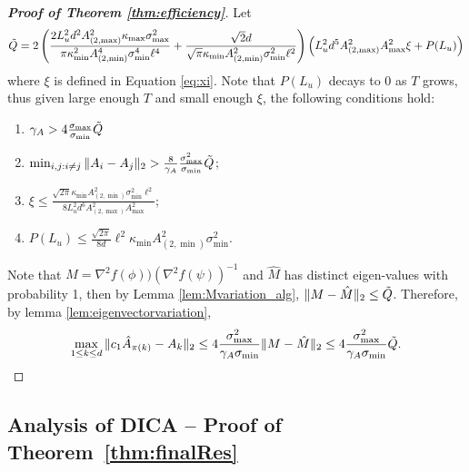 \begin{proof}[{\bf Proof of Theorem  \ref{thm:efficiency}}]
Let 
 \begin{align*}
\tilde{Q} = 2\left( \frac{2L_u^2d^2A_{(2,\max)}^2\kappa_{\max}\sigma_{\max}^2}{\pi\kappa^2_{\min}A^4_{(2,\min)}\sigma_{\min}^4\ell^4} + 
\frac{\sqrt{2}d}{\sqrt{\pi}\kappa_{\min}A^2_{(2,\min)}\sigma_{\min}^2\ell^2}
\right)\left(L_u^2d^5 A_{(2,\max)}^2A_{\max}^2\xi + P(L_u)\right)
 \end{align*}
 where $\xi$ is defined in Equation \eqref{eq:xi}.
 Note that $P(L_u)$ decays to 0 as $T$ grows, thus given large enough $T$ and small enough $\xi$, the following conditions hold:
 \begin{enumerate}
 \item $\gamma_A > 4\frac{\sigma_{\max}}{\sigma_{\min}} \tilde{Q}$
 \item $\min_{i,j:i\neq j} \|A_i - A_j\|_2 > \frac{8}{\gamma_A}\frac{\sigma_{\max}^2}{\sigma_{\min}} \tilde{Q}$;
 \item $\xi \le \frac{\sqrt{2\pi}\kappa_{\min}A^2_{(2,\min)}\sigma_{\min}^2\ell^2}{8L_u^2d^6 A_{(2,\max)}^2A_{\max}^2}$;
 \item  $P(L_u) \le \frac{\sqrt{2\pi}}{8d}\ell^2\kappa_{\min}A^2_{(2,\min)}\sigma_{\min}^2$. 
  \end{enumerate}

Note that $M = \nabla^2f(\phi))(\nabla^2f(\psi))^{-1}$ and $\hat{M}$ has distinct eigen-values with probability 1,  then by Lemma \ref{lem:Mvariation_alg}, $\|M-\hat{M}\|_2 \le \tilde{Q}$.
Therefore, by lemma \ref{lem:eigenvectorvariation}, 
  \[
  \max_{1\le k\le d}\| c_1\hat{A}_{\pi(k)} - A_k\|_2 \le 4 \frac{\sigma_{\max}^2}{\gamma_A \sigma_{\min}}\|M - \hat{M} \|_2 \le 4 \frac{\sigma_{\max}^2}{\gamma_A \sigma_{\min}} \tilde{Q}. 
  \]
 
\end{proof}

\subsection{Analysis of DICA -- Proof of Theorem~\ref{thm:finalRes}}
\label{subsec:ProofModEff}

